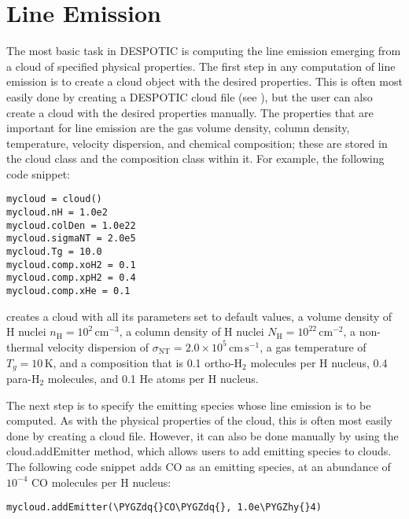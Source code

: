 \documentclass[letterpaper,10pt,english]{sphinxmanual}
\def\PYGZhy{\char`\-}
\def\PYGZdq{\char`\"}
\begin{document}
\section{Line Emission}
\label{functions:ssec-line-emission}\label{functions:line-emission}
The most basic task in DESPOTIC is computing the line emission
emerging from a cloud of specified physical properties. The first step
in any computation of line emission is to create a cloud object with
the desired properties. This is often most easily done by creating a
DESPOTIC cloud file (see {\hyperref[cloudfiles:sec\string-cloudfiles]{}}), but the user can also
create a cloud with the desired properties manually. The properties
that are important for line emission are the gas volume density,
column density, temperature, velocity dispersion, and chemical
composition; these are stored in the cloud class and the composition
class within it. For example, the following code snippet:

\begin{Verbatim}[commandchars=\\\{\}]
mycloud = cloud()
mycloud.nH = 1.0e2
mycloud.colDen = 1.0e22
mycloud.sigmaNT = 2.0e5
mycloud.Tg = 10.0
mycloud.comp.xoH2 = 0.1
mycloud.comp.xpH2 = 0.4
mycloud.comp.xHe = 0.1
\end{Verbatim}

creates a cloud with all its parameters set to default values, a
volume density of H nuclei \(n_{\mathrm{H}} =
10^2\,\mathrm{cm}^{-3}\), a column density of H nuclei
\(N_{\mathrm{H}} = 10^{22}\,\mathrm{cm}^{-2}\), a non-thermal
velocity dispersion of \(\sigma_{\mathrm{NT}} = 2.0 \times
10^5\,\mathrm{cm}\,\mathrm{s}^{-1}\), a gas temperature of \(T_g =
10\,\mathrm{K}\), and a composition that is 0.1
ortho-\(\mathrm{H}_2\) molecules per H nucleus, 0.4
para-\(\mathrm{H}_2\) molecules, and 0.1 He atoms per H nucleus.

The next step is to specify the emitting species whose line emission
is to be computed. As with the physical properties of the cloud, this
is often most easily done by creating a cloud file. However, it can
also be done manually by using the cloud.addEmitter method, which
allows users to add emitting species to clouds. The following code
snippet adds CO as an emitting species, at an abundance of
\(10^{-4}\) CO molecules per H nucleus:

\begin{Verbatim}[commandchars=\\\{\}]
mycloud.addEmitter(\PYGZdq{}CO\PYGZdq{}, 1.0e\PYGZhy{}4)
\end{Verbatim}
\end{document}

